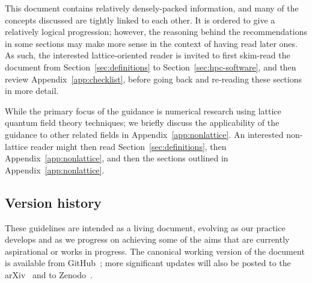 \documentclass{article}
\begin{document}
This document contains relatively densely-packed information,
and many of the concepts discussed are tightly linked to each other.
It is ordered to give a relatively logical progression;
however,
the reasoning behind the recommendations in some sections
may make more sense in the context of having read later ones.
As such,
the interested lattice-oriented reader is invited to first skim-read the document
from Section~\ref{sec:definitions} to Section~\ref{sec:hpc-software},
and then review Appendix~\ref{app:checklist},
before going back and re-reading these sections in more detail.

While the primary focus of the guidance is
numerical research using lattice quantum field theory techniques;
we briefly discuss the applicability of the guidance to other related fields
in Appendix~\ref{app:nonlattice}.
An interested non-lattice reader might then read Section~\ref{sec:definitions},
then Appendix~\ref{app:nonlattice},
and then the sections outlined in Appendix~\ref{app:nonlattice}.

\subsection{Version history}

These guidelines are intended as a living document,
evolving as our practice develops
and as we progress on achieving
some of the aims that are currently aspirational or works in progress.
The canonical working version of the document
is available from GitHub~\cite{this-github};
more significant updates
will also be posted to the arXiv~\cite{this-arxiv} and to Zenodo~\cite{this-zenodo}.
\end{document}
